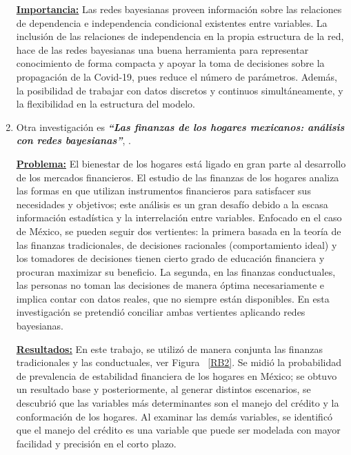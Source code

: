 \documentclass[10pt,conference]{IEEEtran}
\begin{document}
\begin{enumerate}
\textbf{\underline{Importancia:}} 
Las redes bayesianas proveen información sobre las relaciones de dependencia e independencia condicional existentes entre variables. La inclusión de las relaciones de independencia en la propia estructura de la red, hace de las redes bayesianas una buena herramienta para representar conocimiento de forma compacta y apoyar la toma de decisiones sobre la propagación de la Covid-19, pues reduce el número de parámetros. Además, la posibilidad de trabajar con datos discretos y continuos simultáneamente, y la flexibilidad en la estructura del modelo.

\item Otra investigación es \textit{\textbf{“Las finanzas de los hogares mexicanos: análisis con redes bayesianas”}}, \citep{davila2021finanzas}.

\textbf{\underline{Problema:}}
El bienestar de los hogares está ligado en gran parte al desarrollo de los mercados financieros. El estudio de las finanzas de los hogares analiza las formas en que utilizan instrumentos financieros para satisfacer sus necesidades y objetivos; este análisis es un gran desafío debido a la escasa información estadística y la interrelación entre variables. Enfocado en el caso de México, se pueden seguir dos vertientes: la primera basada en la teoría de las finanzas tradicionales, de decisiones racionales (comportamiento ideal) y los tomadores de decisiones tienen cierto grado de educación financiera y procuran maximizar su beneficio. La segunda, en las finanzas conductuales, las personas no toman las decisiones de manera óptima necesariamente e implica contar con datos reales, que no siempre están disponibles. En esta investigación se pretendió conciliar ambas vertientes aplicando redes bayesianas. 

\textbf{\underline{Resultados:}} En este trabajo, se utilizó de manera conjunta las finanzas tradicionales y las conductuales, ver Figura  ~\ref{RB2}. Se midió la probabilidad de prevalencia de estabilidad financiera de los hogares en México; se obtuvo un resultado base y posteriormente, al generar distintos escenarios, se descubrió que las variables más determinantes son el manejo del crédito y la conformación de los hogares. Al examinar las demás variables, se identificó que el manejo del crédito es una variable que puede ser modelada con mayor facilidad y precisión en el corto plazo.


\end{enumerate}
\end{document}
